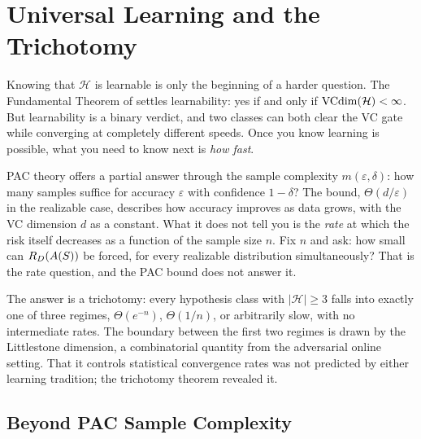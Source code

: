 
\chapter{Universal Learning and the Trichotomy}
\label{ch:universal}

Knowing that $\mathcal{H}$ is learnable is only the beginning of a harder
question.  The Fundamental Theorem of  settles learnability:
yes if and only if $\mathrm{VCdim}(\mathcal{H}) < \infty$.  But learnability is a
binary verdict, and two classes can both clear the VC gate while converging
at completely different speeds.  Once you know learning is possible, what
you need to know next is \emph{how fast}.

PAC theory offers a partial answer through the sample complexity
$m(\varepsilon, \delta)$: how many samples suffice for accuracy $\varepsilon$
with confidence $1 - \delta$?  The bound, $\Theta(d/\varepsilon)$ in
the realizable case, describes how accuracy improves as data grows, with the
VC dimension $d$ as a constant.  What it does not tell you is the
\emph{rate} at which the risk itself decreases as a function of the sample
size $n$.  Fix $n$ and ask: how small can $R_D(A(S))$ be forced, for
every realizable distribution simultaneously?  That is the rate question,
and the PAC bound does not answer it.

The answer is a trichotomy: every hypothesis class
with $|\mathcal{H}| \geq 3$ falls into exactly one of three regimes,
$\Theta(e^{-n})$, $\Theta(1/n)$, or arbitrarily slow, with no intermediate
rates.  The boundary between the first two regimes is drawn by the Littlestone
dimension, a combinatorial quantity from the adversarial online setting.
That it controls statistical convergence rates was not predicted by either
learning tradition; the trichotomy theorem revealed it.



\section{Beyond PAC Sample Complexity}
\label{sec:universal-question}

